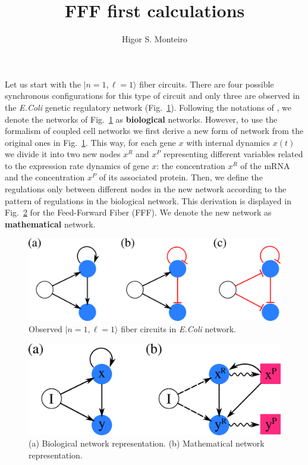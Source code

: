 \documentclass[12pt]{article}
\begin{document}
\title{FFF first calculations}
\author{Higor S. Monteiro}

\maketitle

Let us start with the $| n = 1, \ell = 1 \rangle$ fiber circuits. 
There are four possible synchronous configurations for this
type of circuit and only three are observed in the \textit{E.Coli} 
genetic regulatory network (Fig.~\ref{fig:fig1}). Following the notations
of \cite{ian_coupled_bifur}, we denote the networks of Fig.~\ref{fig:fig1} as 
\textbf{biological} networks. However, to use the formalism of coupled cell networks
\cite{coupled-cell} we first derive a new form of network from the original
ones in Fig.~\ref{fig:fig1}. This way, for each gene $x$ with internal dynamics $x(t)$
we divide it into two new nodes $x^R$ and $x^P$ representing different variables
related to the expression rate dynamics of gene $x$: the concentration $x^R$ of
the mRNA and the concentration $x^P$ of its associated protein. Then, we define
the regulations only between different nodes in the new network according to the
pattern of regulations in the biological network. This 
derivation is displayed in Fig.~\ref{fig:fig2} for the Feed-Forward Fiber (FFF).
We denote the new network as \textbf{mathematical} network.

\begin{figure}[H]
    \centering
    \includegraphics[scale=0.44]{drawings/fig1.png}
    \caption{Observed $| n = 1, \ell = 1 \rangle$ fiber circuits in \textit{E.Coli} network.}
    \label{fig:fig1}
\end{figure}

\begin{figure}[H]
    \centering
    \includegraphics[scale=0.48]{drawings/fig2.png}
    \caption{(a) Biological network representation. (b) Mathematical network representation.}
    \label{fig:fig2}
\end{figure}
\end{document}
